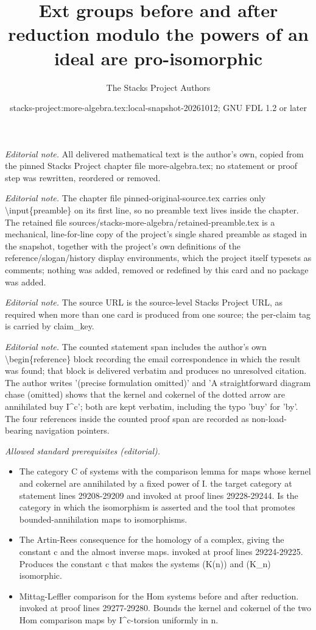 \documentclass[10pt,a4paper]{amsart}
\title{Ext groups before and after reduction modulo the powers of an ideal are pro-isomorphic}
\author{The Stacks Project Authors}
\date{stacks-project:more-algebra.tex:local-snapshot-20261012; GNU FDL 1.2 or later}
\theoremstyle{plain}
\theoremstyle{definition}
\theoremstyle{remark}
\numberwithin{equation}{subsection}
\begin{document}
\maketitle
\setcounter{subsection}{1}
\noindent\textit{Editorial note.} All delivered mathematical text is the author's own, copied from the pinned Stacks Project chapter file more-algebra.tex; no statement or proof step was rewritten, reordered or removed.\par\medskip
\noindent\textit{Editorial note.} The chapter file pinned-original-source.tex carries only \textbackslash{}input\{preamble\} on its first line, so no preamble text lives inside the chapter. The retained file sources/stacks-more-algebra/retained-preamble.tex is a mechanical, line-for-line copy of the project's single shared preamble as staged in the snapshot, together with the project's own definitions of the reference/slogan/history display environments, which the project itself typesets as comments; nothing was added, removed or redefined by this card and no package was added.\par\medskip
\noindent\textit{Editorial note.} The source URL is the source-level Stacks Project URL, as required when more than one card is produced from one source; the per-claim tag is carried by claim\_key.\par\medskip
\noindent\textit{Editorial note.} The counted statement span includes the author's own \textbackslash{}begin\{reference\} block recording the email correspondence in which the result was found; that block is delivered verbatim and produces no unresolved citation. The author writes '(precise formulation omitted)' and 'A straightforward diagram chase (omitted) shows that the kernel and cokernel of the dotted arrow are annihilated buy I\textasciicircum{}c'; both are kept verbatim, including the typo 'buy' for 'by'. The four references inside the counted proof span are recorded as non-load-bearing navigation pointers.\par\medskip
\noindent\textit{Allowed standard prerequisites (editorial).}\begin{itemize}
\item The category C of systems with the comparison lemma for maps whose kernel and cokernel are annihilated by a fixed power of I. the target category at statement lines 29208-29209 and invoked at proof lines 29228-29244. Is the category in which the isomorphism is asserted and the tool that promotes bounded-annihilation maps to isomorphisms.
\item The Artin-Rees consequence for the homology of a complex, giving the constant c and the almost inverse maps. invoked at proof lines 29224-29225. Produces the constant c that makes the systems (K(n)) and (K\_n) isomorphic.
\item Mittag-Leffler comparison for the Hom systems before and after reduction. invoked at proof lines 29277-29280. Bounds the kernel and cokernel of the two Hom comparison maps by I\textasciicircum{}c-torsion uniformly in n.
\end{itemize}\medskip
\end{document}
